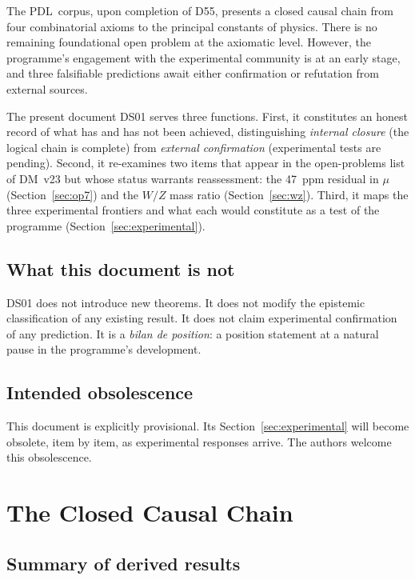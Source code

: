 \documentclass[12pt,a4paper]{article}
\theoremstyle{definition}
\newcommand{\PDL}{\textsc{PDL}}
\begin{document}
The \PDL\ corpus, upon completion of D55, presents a closed causal chain from four combinatorial axioms to the principal constants of physics. There is no remaining foundational open problem at the axiomatic level. However, the programme's engagement with the experimental community is at an early stage, and three falsifiable predictions await either confirmation or refutation from external sources.

The present document DS01 serves three functions. First, it constitutes an honest record of what has and has not been achieved, distinguishing \emph{internal closure} (the logical chain is complete) from \emph{external confirmation} (experimental tests are pending). Second, it re-examines two items that appear in the open-problems list of DM~v23 but whose status warrants reassessment: the 47~ppm residual in $\mu$ (Section~\ref{sec:op7}) and the $W/Z$ mass ratio (Section~\ref{sec:wz}). Third, it maps the three experimental frontiers and what each would constitute as a test of the programme (Section~\ref{sec:experimental}).

\subsection{What this document is not}

DS01 does not introduce new theorems. It does not modify the epistemic classification of any existing result. It does not claim experimental confirmation of any prediction. It is a \emph{bilan de position}: a position statement at a natural pause in the programme's development.

\subsection{Intended obsolescence}

This document is explicitly provisional. Its Section~\ref{sec:experimental} will become obsolete, item by item, as experimental responses arrive. The authors welcome this obsolescence.

\section{The Closed Causal Chain}
\label{sec:chain}

\subsection{Summary of derived results}
\end{document}
